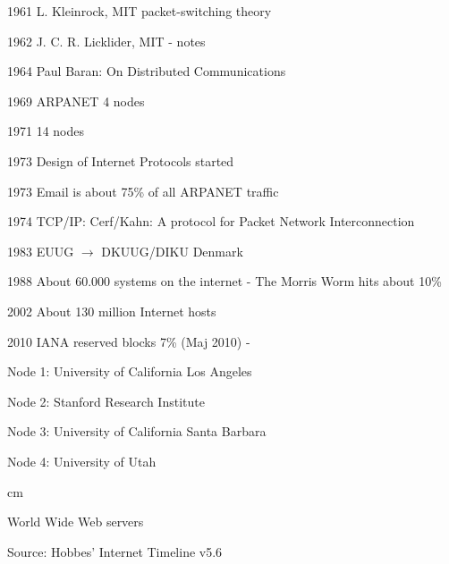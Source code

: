 \documentclass[Screen16to9,17pt]{foils}
\begin{document}
\begin{list2}
\item[1961]  L. Kleinrock, MIT packet-switching theory
\item[1962]  J. C. R. Licklider, MIT - notes
\item[1964]  Paul Baran: On Distributed Communications
\item[1969]  ARPANET 4 nodes
\item[1971]  14 nodes
\item[1973]  Design of Internet Protocols started
\item[1973]  Email is about 75\% of all ARPANET traffic
\item[1974]  TCP/IP: Cerf/Kahn: A protocol for Packet
        Network Interconnection
\item[1983]  EUUG $\rightarrow$ DKUUG/DIKU Denmark
\item[1988]  About 60.000 systems on the internet -
        The Morris Worm hits about 10\%
\item[2002] About 130 million Internet hosts
\item[2010] IANA reserved blocks 7\% (Maj 2010) - 
\end{list2}


\begin{list2}
\item Node 1: University of California Los Angeles
\item Node 2: Stanford Research Institute
\item Node 3: University of California Santa Barbara
\item Node 4: University of Utah
\end{list2}


 cm

\centerline{World Wide Web servers}


\begin{list1}
\item Source: Hobbes' Internet Timeline v5.6
\end{list1}
\end{document}
